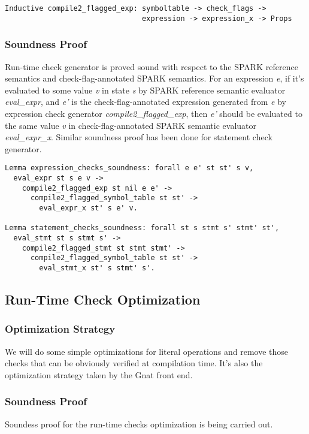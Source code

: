 \begin{lstlisting}[escapechar=\#, language=coq, basicstyle=\small] 
Inductive compile2_flagged_exp: symboltable -> check_flags -> 
                                expression -> expression_x -> Props
\end{lstlisting}

\subsubsection{Soundness Proof}
Run-time check generator is proved sound with respect to the SPARK reference
semantics and check-flag-annotated SPARK semantics. For an expression
\textit{e}, if it's evaluated to some value \textit{v} in state \textit{s} by
SPARK reference semantic evaluator \textit{eval\_expr}, and \textit{e'} is the
check-flag-annotated expression generated from \textit{e} by expression check
generator \textit{compile2\_flagged\_exp}, then \textit{e'} should be evaluated
to the same value \textit{v} in check-flag-annotated SPARK semantic evaluator
\textit{eval\_expr\_x}. Similar soundness proof has been done for statement
check generator.

\begin{lstlisting}[escapechar=\#, language=coq, basicstyle=\small]
Lemma expression_checks_soundness: forall e e' st st' s v,
  eval_expr st s e v ->
    compile2_flagged_exp st nil e e' ->
      compile2_flagged_symbol_table st st' ->
        eval_expr_x st' s e' v.
        
Lemma statement_checks_soundness: forall st s stmt s' stmt' st',
  eval_stmt st s stmt s' -> 
    compile2_flagged_stmt st stmt stmt' ->
      compile2_flagged_symbol_table st st' ->
        eval_stmt_x st' s stmt' s'.
\end{lstlisting}

\subsection{Run-Time Check Optimization}
\subsubsection{Optimization Strategy}
We will do some simple optimizations for literal operations and remove those
checks that can be obviously verified at compilation time. It's also the
optimization strategy taken by the Gnat front end.
\subsubsection{Soundness Proof}
Soundess proof for the run-time checks optimization is being carried out.

